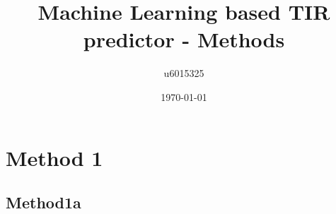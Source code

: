 \documentclass{article}
\title{Machine Learning based TIR predictor - Methods}
\author{u6015325 }
\date{\today{}}
\begin{document}
\maketitle

\section{Method 1}
\subsection{Method1a}
\end{document}
